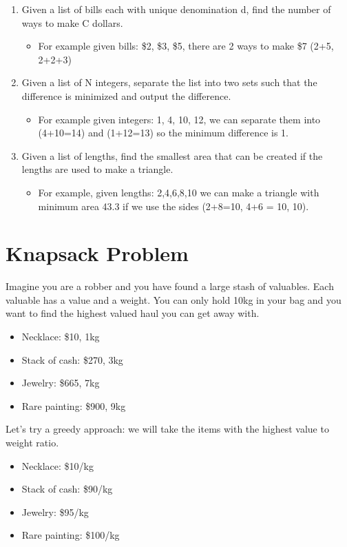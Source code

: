 \documentclass[11pt,oneside]{book}
\begin{document}
\begin{enumerate}
\item Given a list of bills each with unique denomination d, find the number of ways to make C dollars. 

\begin{itemize}
\item For example given bills: \$2, \$3, \$5, there are 2 ways to make \$7 (2+5, 2+2+3)
\end{itemize}
\item Given a list of N integers, separate the list into two sets such that the difference is minimized and output the difference.

\begin{itemize}
\item For example given integers: 1, 4, 10, 12, we can separate them into (4+10=14) and (1+12=13) so the minimum difference is 1.
\end{itemize}
\item Given a list of lengths, find the smallest area that can be created if  the lengths are used to make a triangle. 

\begin{itemize}
\item For example, given lengths: 2,4,6,8,10 we can make a triangle with minimum area 43.3 if we use the sides (2+8=10, 4+6 = 10, 10).
\end{itemize}
\end{enumerate}
\section{Knapsack Problem}

Imagine you are a robber and you have found a large stash of valuables. Each valuable has a value and a weight. You can only hold 10kg in your bag and you want to find the highest valued haul you can get away with.

\begin{itemize}
\item Necklace: \$10, 1kg
\item Stack of cash: \$270, 3kg
\item Jewelry: \$665, 7kg
\item Rare painting: \$900, 9kg
\end{itemize}

Let's try a greedy approach: we will take the items with the highest value to weight ratio.

\begin{itemize}
\item Necklace: \$10/kg
\item Stack of cash: \$90/kg
\item Jewelry: \$95/kg
\item Rare painting: \$100/kg
\end{itemize}
\end{document}
